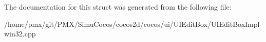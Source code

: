 The documentation for this struct was generated from the following file\+:\begin{DoxyCompactItemize}
\item 
/home/pmx/git/\+P\+M\+X/\+Simu\+Cocos/cocos2d/cocos/ui/\+U\+I\+Edit\+Box/U\+I\+Edit\+Box\+Impl-\/win32.\+cpp\end{DoxyCompactItemize}
